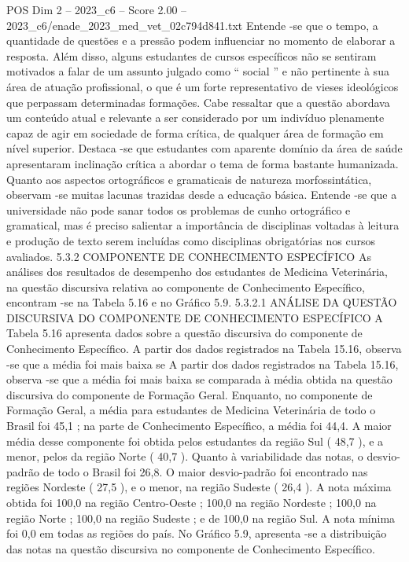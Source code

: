\begin{textsample}{POS Dim 2 – 2023\_c6 – Score 2.00 – 2023\_c6/enade\_2023\_med\_vet\_02c794d841.txt}
Entende -se que o tempo, a quantidade de questões e a pressão podem influenciar no momento de elaborar a resposta.
Além disso, alguns estudantes de cursos específicos não se sentiram motivados a falar de um assunto julgado como “ social ” e não pertinente à sua área de atuação profissional, o que é um forte representativo de vieses ideológicos que perpassam determinadas formações.
Cabe ressaltar que a questão abordava um conteúdo atual e relevante a ser considerado por um indivíduo plenamente capaz de agir em sociedade de forma crítica, de qualquer área de formação em nível superior.
Destaca -se que estudantes com aparente domínio da área de saúde apresentaram inclinação crítica a abordar o tema de forma bastante humanizada.
Quanto aos aspectos ortográficos e gramaticais de natureza morfossintática, observam -se muitas lacunas trazidas desde a educação básica.
Entende -se que a universidade não pode sanar todos os problemas de cunho ortográfico e gramatical, mas é preciso salientar a importância de disciplinas voltadas à leitura e produção de texto serem incluídas como disciplinas obrigatórias nos cursos avaliados. 5.3.2 COMPONENTE DE CONHECIMENTO ESPECÍFICO As análises dos resultados de desempenho dos estudantes de Medicina Veterinária, na questão discursiva relativa ao componente de Conhecimento Específico, encontram -se na Tabela 5.16 e no Gráfico 5.9. 5.3.2.1 ANÁLISE DA QUESTÃO DISCURSIVA DO COMPONENTE DE CONHECIMENTO ESPECÍFICO A Tabela 5.16 apresenta dados sobre a questão discursiva do componente de Conhecimento Específico.
A partir dos dados registrados na Tabela 15.16, observa -se que a média foi mais baixa se A partir dos dados registrados na Tabela 15.16, observa -se que a média foi mais baixa se comparada à média obtida na questão discursiva do componente de Formação Geral.
Enquanto, no componente de Formação Geral, a média para estudantes de Medicina Veterinária de todo o Brasil foi 45,1 ; na parte de Conhecimento Específico, a média foi 44,4.
A maior média desse componente foi obtida pelos estudantes da região Sul ( 48,7 ), e a menor, pelos da região Norte ( 40,7 ).
Quanto à variabilidade das notas, o desvio-padrão de todo o Brasil foi 26,8.
O maior desvio-padrão foi encontrado nas regiões Nordeste ( 27,5 ), e o menor, na região Sudeste ( 26,4 ).
A nota máxima obtida foi 100,0 na região Centro-Oeste ; 100,0 na região Nordeste ; 100,0 na região Norte ; 100,0 na região Sudeste ; e de 100,0 na região Sul.
A nota mínima foi 0,0 em todas as regiões do país.
No Gráfico 5.9, apresenta -se a distribuição das notas na questão discursiva no componente de Conhecimento Específico.

\end{textsample}
